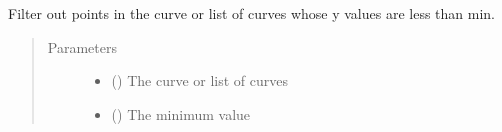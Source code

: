 \documentclass[letterpaper,10pt,english]{sphinxmanual}
\begin{document}

\begin{fulllineitems}
\label{\detokenize{pydv:pydvpy.ymin}}
Filter out points in the curve or list of curves whose y values are less than min.
\begin{quote}\begin{description}
\item[{Parameters}] \leavevmode\begin{itemize}
\item {} 
 () \textendash{} The curve or list of curves

\item {} 
 () \textendash{} The minimum value

\end{itemize}

\end{description}\end{quote}

\end{fulllineitems}

\end{document}
